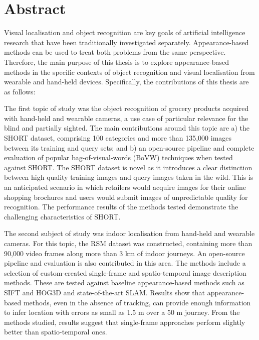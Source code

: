 \begingroup
\let\clearpage\relax
\let\cleardoublepage\relax
\let\cleardoublepage\relax

\chapter*{Abstract}

Visual localisation and object recognition are key goals of artificial intelligence research that have been traditionally investigated separately. Appearance-based methods can be used to treat both problems from the same perspective. Therefore, the main purpose of this thesis is to explore appearance-based methods in the specific contexts of object recognition and visual localisation from wearable and hand-held devices. Specifically, the contributions of this thesis are as follows:

The first topic of study was the object recognition of grocery products acquired with hand-held and wearable cameras, a use case of particular relevance for the blind and partially sighted. The main contributions around this topic are a) the SHORT dataset, comprising 100 categories and more than 135,000 images between its training and query sets; and b) an open-source pipeline and complete evaluation of popular bag-of-visual-words (BoVW) techniques when tested against SHORT. The SHORT dataset is novel as it introduces a clear distinction between high quality training images and query images taken in the wild. This is an anticipated scenario in which retailers would acquire images for their online shopping brochures and users would submit images of unpredictable quality for recognition. The performance results of the methods tested demonstrate the challenging characteristics of SHORT.

The second subject of study was indoor localisation from hand-held and wearable cameras. For this topic, the RSM dataset was constructed, containing more than 90,000 video frames along more than 3 km of indoor journeys. An open-source pipeline and evaluation is also contributed in this area. The methods include a selection of custom-created single-frame and spatio-temporal image description methods. These are tested against baseline appearance-based methods such as SIFT and HOG3D and state-of-the-art SLAM. Results show that appearance-based methods, even in the absence of tracking, can provide enough information to infer location with errors as small as 1.5 m over a 50 m journey. From the methods studied, results suggest that single-frame approaches perform slightly better than spatio-temporal ones.

